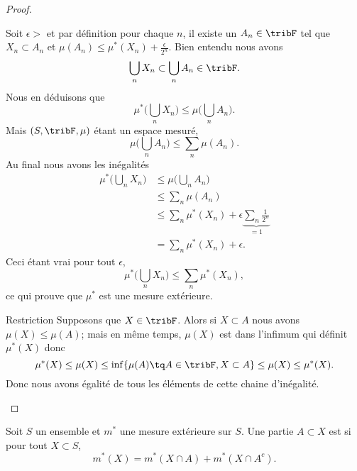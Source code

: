 \begin{proof}
\begin{subproof}
		Soit \( \epsilon>\) et par définition pour chaque \( n\), il existe un \( A_n\in \tribF\) tel que \( X_n\subset A_n\) et \( \mu(A_n)\leq \mu^*(X_n)+\frac{ \epsilon }{ 2^n }\). Bien entendu nous avons
		\begin{equation}
			\bigcup_nX_n\subset \bigcup_nA_n\in\tribF.
		\end{equation}
		Nous en déduisons que
		\begin{equation}
			\mu^*\big( \bigcup_nX_n \big)\leq\mu\big( \bigcup_nA_n \big).
		\end{equation}
		Mais \( (S,\tribF,\mu)\) étant un espace mesuré,
		\begin{equation}
			\mu\big( \bigcup_nA_n \big)\leq \sum_n\mu(A_n).
		\end{equation}
		Au final nous avons les inégalités
		\begin{subequations}
			\begin{align}
				\mu^*\big( \bigcup_nX_n \big) & \leq  \mu\big( \bigcup_nA_n \big)                                       \\
				                              & \leq  \sum_n\mu(A_n)                                                    \\
				                              & \leq  \sum_n\mu^*(X_n)+\epsilon\underbrace{ \sum_n\frac{1}{ 2^n }}_{=1} \\
				                              & =   \sum_n\mu^*(X_n)+\epsilon.
			\end{align}
		\end{subequations}
		Ceci étant vrai pour tout \( \epsilon\),
		\begin{equation}
			\mu^*\big( \bigcup_nX_n \big)\leq\sum_n\mu^*(X_n),
		\end{equation}
		ce qui prouve que \( \mu^*\) est une mesure extérieure.
		\item[Restriction]
		Supposons que \( X\in\tribF\). Alors si \( X\subset A\) nous avons \( \mu(X)\leq \mu(A)\); mais en même temps, \( \mu(X)\) est dans l'infimum qui définit \( \mu^*(X)\) donc
		\begin{equation}
			\mu^*(X)\leq\mu(X)\leq \inf \{ \mu(A)\tq A\in\tribF,X\subset A \}\leq \mu(X)\leq\mu^*(X).
		\end{equation}
		Donc nous avons égalité de tous les éléments de cette chaine d'inégalité.
	\end{subproof}
\end{proof}

\begin{definition}  \label{DefTRBoorvnUY}
	Soit \( S\) un ensemble et \( m^*\) une mesure extérieure sur \( S\). Une partie \( A\subset X\) est  si pour tout \( X\subset S\),
	\begin{equation}
		m^*(X)=m^*(X\cap A)+m^*(X\cap A^c).
	\end{equation}
\end{definition}

